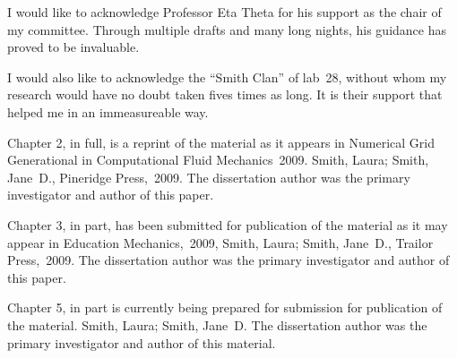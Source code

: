 \documentclass[12pt]{ucsddissertation}
\begin{document}
\tableofcontents
\listoffigures
\listoftables


\begin{acknowledgements}
I would like to acknowledge Professor Eta Theta for his support as the
chair of my committee. Through multiple drafts and many long nights,
his guidance has proved to be invaluable.

I would also like to acknowledge the ``Smith Clan'' of lab~28, without
whom my research would have no doubt taken fives times as long. It is
their support that helped me in an immeasureable way.

Chapter 2, in full, is a reprint of the material as it appears in
Numerical Grid Generational in Computational Fluid Mechanics~2009.
Smith, Laura; Smith, Jane~D., Pineridge Press,~2009. The dissertation
author was the primary investigator and author of this paper.

Chapter 3, in part, has been submitted for publication of the material
as it may appear in Education Mechanics,~2009, Smith, Laura; Smith,
Jane~D., Trailor Press,~2009. The dissertation author was the primary
investigator and author of this paper.

Chapter 5, in part is currently being prepared for submission for
publication of the material. Smith, Laura; Smith, Jane~D\@. The
dissertation author was the primary investigator and author of this
material.
\end{acknowledgements}

\end{document}
